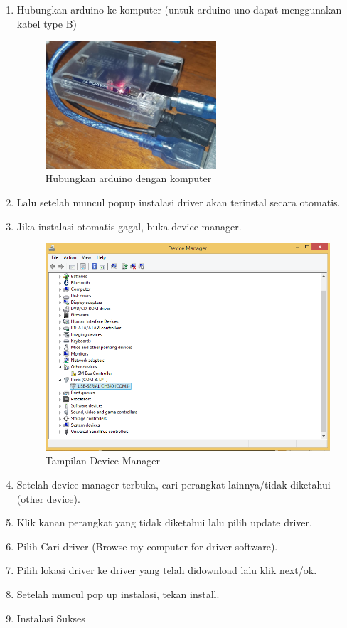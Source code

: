 \begin{enumerate}
	\item Hubungkan arduino ke komputer (untuk arduino uno dapat menggunakan kabel type B)
	\begin{figure} [ht]
		\centerline{\includegraphics[width=0.6\textwidth]{figures/5/1174035/Teori/Soal1Step1.jpeg}}
		\caption{Hubungkan arduino dengan komputer}
		\label{Soal1Step1}
	\end{figure}
	\item Lalu setelah muncul popup instalasi driver akan terinstal secara otomatis. 
	\item Jika instalasi otomatis gagal, buka device manager.
		\begin{figure} [ht]
			\centerline{\includegraphics[width=1\textwidth]{figures/5/1174035/Teori/DeviceManagerContoh.png}}
			\caption{Tampilan Device Manager}
			\label{DevManagerContoh}
		\end{figure}
	\item Setelah device manager terbuka, cari perangkat lainnya/tidak diketahui (other device).
	\item Klik kanan perangkat yang tidak diketahui lalu pilih update driver.
	\item Pilih Cari driver (Browse my computer for driver software).
	\item Pilih lokasi driver ke driver yang telah didownload lalu klik next/ok.
	\item Setelah muncul pop up instalasi, tekan install.
	\item Instalasi Sukses
\end{enumerate}

